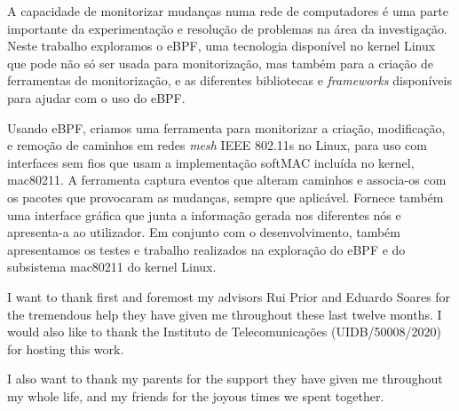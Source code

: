 
A capacidade de monitorizar mudanças numa rede de computadores é uma parte
importante da experimentação e resolução de problemas na área da investigação.
Neste trabalho exploramos o eBPF, uma tecnologia disponível no kernel Linux que
pode não só ser usada para monitorização, mas também para a criação de
ferramentas de monitorização, e as diferentes bibliotecas e \textit{frameworks}
disponíveis para ajudar com o uso do eBPF.

Usando eBPF, criamos uma ferramenta para monitorizar a criação, modificação, e
remoção de caminhos em redes \textit{mesh} \ac{IEEE} 802.11s no Linux, para uso
com interfaces sem fios que usam a implementação softMAC incluída no kernel,
mac80211. A ferramenta captura eventos que alteram caminhos e associa-os com os
pacotes que provocaram as mudanças, sempre que aplicável. Fornece também uma
interface gráfica que junta a informação gerada nos diferentes nós e apresenta-a
ao utilizador. Em conjunto com o desenvolvimento, também apresentamos os testes
e trabalho realizados na exploração do eBPF e do subsistema mac80211 do kernel
Linux.



I want to thank first and foremost my advisors Rui Prior and Eduardo Soares for
the tremendous help they have given me throughout these last twelve months. I
would also like to thank the Instituto de Telecomunicações (UIDB/50008/2020) for
hosting this work.

I also want to thank my parents for the support they have given me throughout my
whole life, and my friends for the joyous times we spent together.
